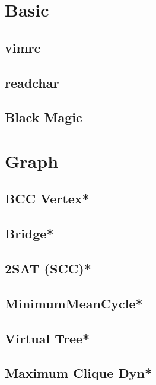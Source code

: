 \section{Basic}
\subsection{vimrc}

\subsection{readchar}

\subsection{Black Magic}

% 


\section{Graph}
\subsection{BCC Vertex*} %

\subsection{Bridge*} %

\subsection{2SAT (SCC)*} %

\subsection{MinimumMeanCycle*} %

\subsection{Virtual Tree*} %

\subsection{Maximum Clique Dyn*} %
 
